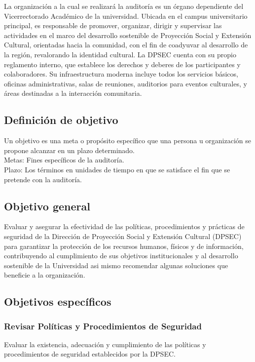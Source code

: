 \documentclass[12pt,a4paper]{article}
\begin{document}
La organización a la cual se realizará la auditoría es un órgano dependiente del Vicerrectorado Académico de la universidad. Ubicada en el campus universitario principal, es responsable de promover, organizar, dirigir y supervisar las actividades en el marco del desarrollo sostenible de Proyección Social y Extensión Cultural, orientadas hacia la comunidad, con el fin de coadyuvar al desarrollo de la región, revalorando la identidad cultural.
\espacio
La DPSEC cuenta con su propio reglamento interno, que establece los derechos y deberes de los participantes y colaboradores. Su infraestructura moderna incluye todos los servicios básicos, oficinas administrativas, salas de reuniones, auditorios para eventos culturales, y áreas destinadas a la interacción comunitaria.



\newpage
\subsection*{Definición de objetivo}
Un objetivo es una meta o propósito específico que una persona u organización se propone alcanzar en un plazo determinado.
\\
Metas: Fines específicos de la auditoría.
\\
Plazo: Los términos en unidades de tiempo en que se satisface el fin que se
pretende con la auditoría.


\subsection{Objetivo general}
Evaluar y asegurar la efectividad de las políticas, procedimientos y prácticas de seguridad de la Dirección de Proyección Social y Extensión Cultural (DPSEC) para garantizar la protección de los recursos humanos, físicos y de información, contribuyendo al cumplimiento de sus objetivos institucionales y al desarrollo sostenible de la Universidad asi mismo recomendar algunas soluciones que beneficie a la organización.

\subsection{Objetivos específicos}
\subsubsection*{Revisar Políticas y Procedimientos de Seguridad} Evaluar la existencia, adecuación y cumplimiento de las políticas y procedimientos de seguridad establecidos por la DPSEC.
\end{document}
